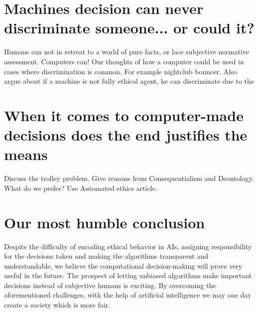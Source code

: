 \documentclass[11pt]{article}
\begin{document}
\section{Machines decision can never discriminate someone... or could it?}
Humans can not in retreat to a world of pure facts, or lace subjective normative assessment. Computers can!
Our thoughts of how a computer could be used in cases where discrimination is common. For example nightclub bouncer. Also argue about if a machine is not fully ethical agent, he can discriminate due to the

\section{When it comes to computer-made decisions does the end justifies the means}
Discuss the trolley problem. Give reasons from Consequentialism and Deontology.
What do we prefer? Use Automated ethics article.

\section{Our most humble conclusion}
Despite the difficulty of encoding ethical behavior in AIs,
assigning responsibility for the decisions taken and making the algorithms
transparent and understandable, we believe the computational decision-making
will prove very useful in the future. The prospect of letting unbiased
algorithms make important decisions instead of subjective humans is exciting. By
overcoming the aforementioned challenges, with the help of artificial
intelligence we may one day create a society which is more fair.





\end{document}
